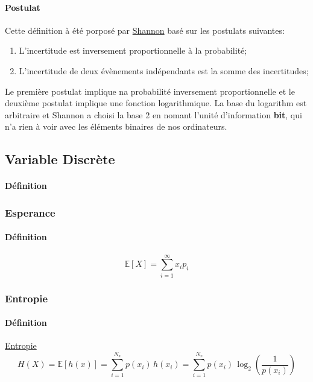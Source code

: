 \documentclass{article}
\begin{document}
\paragraph{Postulat}Cette définition à été porposé par \href{https://fr.wikipedia.org/wiki/Claude_Shannon}{Shannon} basé sur les postulats suivantes:
\begin{enumerate}
    \item L'incertitude est inversement proportionnelle à la probabilité;
    \item L'incertitude de deux évènements indépendants est la somme des incertitudes;
\end{enumerate}
Le première postulat implique na probabilité inversement proportionnelle et le deuxième postulat implique une fonction logarithmique. La base du logarithm est arbitraire et Shannon a choisi la base 2 en nomant l'unité d'information \textbf{bit}, qui n'a rien à voir avec les éléments binaires de nos ordinateurs.


\subsection{Variable Discrète}
\paragraph{Définition}

\subsubsection{Esperance}
\paragraph{Définition}
\begin{equation}\label{eq:esperance_discrete}
    \boxed{
        \mathbb{E}[X] = \sum_{i=1}^{\infty} x_i p_i
    }
\end{equation}

\subsubsection{Entropie}
\paragraph{Définition} \href{https://www.youtube.com/watch?v=nAA7UyiCIOE}{Entropie}
\begin{equation}
    \boxed{
        H(X) = \mathbb{E}[h(x)] = 
        \sum_{i=1}^{N_x} p(x_i)\,h(x_i) = 
        \sum_{i=1}^{N_x} p(x_i)\,\log_{2}\left(\frac{1}{p(x_i)}\right)
    }
\end{equation}
\end{document}
